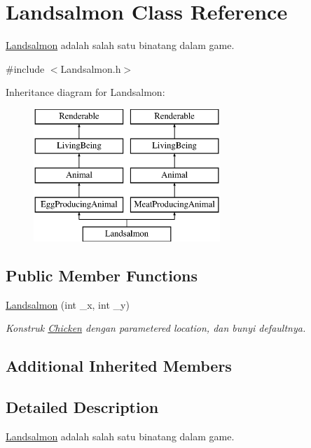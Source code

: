 \hypertarget{classLandsalmon}{}\section{Landsalmon Class Reference}
\label{classLandsalmon}


\mbox{\hyperlink{classLandsalmon}{Landsalmon}} adalah salah satu binatang dalam game.  




{\ttfamily \#include $<$Landsalmon.\+h$>$}

Inheritance diagram for Landsalmon\+:\begin{figure}[H]
\begin{center}
\leavevmode
\includegraphics[height=5.000000cm]{classLandsalmon}
\end{center}
\end{figure}
\subsection*{Public Member Functions}
\begin{DoxyCompactItemize}
\item 
\mbox{\hyperlink{classLandsalmon_ad48e73eaf7d9799ea6b1d1365bcacb04}{Landsalmon}} (int \+\_\+x, int \+\_\+y)
\begin{DoxyCompactList}\small\item\em Konstruk \mbox{\hyperlink{classChicken}{Chicken}} dengan parametered location, dan bunyi defaultnya. \end{DoxyCompactList}\end{DoxyCompactItemize}
\subsection*{Additional Inherited Members}


\subsection{Detailed Description}
\mbox{\hyperlink{classLandsalmon}{Landsalmon}} adalah salah satu binatang dalam game. 

